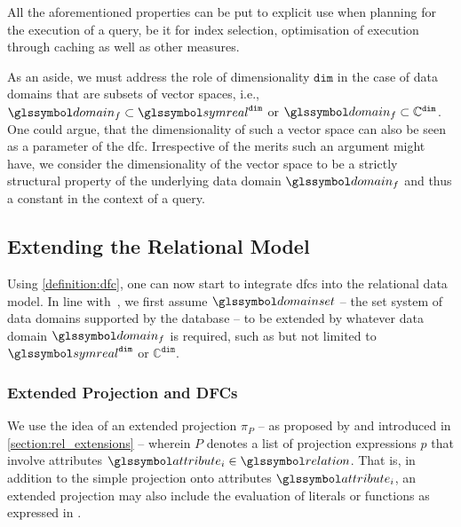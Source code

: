 All the aforementioned properties can be put to explicit use when planning for the execution of a query, be it for index selection, optimisation of execution through caching as well as other measures.

As an aside, we must address the role of dimensionality $\mathtt{dim}$ in the case of data domains that are subsets of vector spaces, i.e.,  $\domain_f \subset \symreal^{\mathtt{dim}}$ or $\domain_f \subset \mathbb{C}^{\mathtt{dim}}$. One could argue, that the dimensionality of such a vector space can also be seen as a parameter of the \acrshort{dfc}. Irrespective of the merits such an argument might have, we consider the dimensionality of the vector space to be a strictly structural property of the underlying data domain $\domain_f$ and thus a constant in the context of a query.

\subsection{Extending the Relational Model}

Using \cref{definition:dfc}, one can now start to integrate \acrshort{dfc}s into the relational data model. In line with~\cite{Giangreco:2018Database}, we first assume $\domainset$ -- the set system of data domains supported by the database -- to be extended by whatever data domain $\domain_f$ is required, such as but not limited to $\symreal^{\mathtt{dim}}$ or $\mathbb{C}^{\mathtt{dim}}$. 

\subsubsection{Extended Projection and DFCs}

We use the idea of an extended projection $\pi_{P}$ -- as proposed by \cite{Gupta:1995Generalized,Garcia:2009Database} and introduced in \cref{section:rel_extensions} -- wherein $P$ denotes a list of projection expressions $p$ that involve attributes $\attribute_i \in \relation$. That is, in addition to the simple projection onto attributes $\attribute_i$, an extended projection may also include the evaluation of literals or functions as expressed in . 

